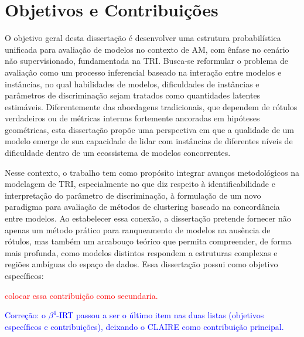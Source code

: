 \section{Objetivos e Contribuições}
\label{objetivos}

O objetivo geral desta dissertação é desenvolver uma estrutura probabilística unificada para avaliação de modelos no contexto de \gls{AM}, com ênfase no cenário não supervisionado, fundamentada na \gls{TRI}. Busca-se reformular o problema de avaliação como um processo inferencial baseado na interação entre modelos e instâncias, no qual habilidades de modelos, dificuldades de instâncias e parâmetros de discriminação sejam tratados como quantidades latentes estimáveis. Diferentemente das abordagens tradicionais, que dependem de rótulos verdadeiros ou de métricas internas fortemente ancoradas em hipóteses geométricas, esta dissertação propõe uma perspectiva em que a qualidade de um modelo emerge de sua capacidade de lidar com instâncias de diferentes níveis de dificuldade dentro de um ecossistema de modelos concorrentes.

Nesse contexto, o trabalho tem como propósito integrar avanços metodológicos na modelagem de \gls{TRI}, especialmente no que diz respeito à identificabilidade e interpretação do parâmetro de discriminação, à formulação de um novo paradigma para avaliação de métodos de clustering baseado na concordância entre modelos. Ao estabelecer essa conexão, a dissertação pretende fornecer não apenas um método prático para ranqueamento de modelos na ausência de rótulos, mas também um arcabouço teórico que permita compreender, de forma mais profunda, como modelos distintos respondem a estruturas complexas e regiões ambíguas do espaço de dados. Essa dissertação possui como objetivo específicos:

\textcolor{red}{colocar essa contribuição como secundaria.}

\textcolor{blue}{Correção: o $\beta^4$-\gls{IRT} passou a ser o último item nas duas listas (objetivos específicos e contribuições), deixando o \gls{CLAIRE} como contribuição principal.}

